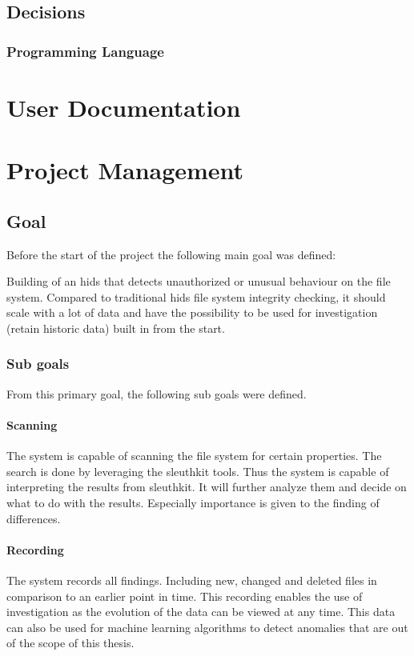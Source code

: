 \documentclass[
	a4paper,					%
	10pt,							%
	twoside,					%
	openright,				%
	notitlepage,			%
	parskip=half,			%
]{scrreprt}					%
\begin{document}
\section{Decisions}
\label{sec:decisions}

\subsection{Programming Language}
\label{sec:decisions:language}

\chapter{User Documentation}

\chapter{Project Management}

\section{Goal}
\label{apdx-sec:goal}
Before the start of the project the following main goal was defined:

Building of an \gls{hids} that detects unauthorized or unusual behaviour on the file system. Compared to traditional \gls{hids} file system integrity checking, it should scale with a lot of data and have the possibility to be used for investigation (retain historic data) built in from the start.

\subsection{Sub goals}

From this primary goal, the following sub goals were defined. 

\subsubsection{Scanning}
The system is capable of scanning the file system for certain properties. The search is done by leveraging the sleuthkit tools. Thus the system is capable of interpreting the results from sleuthkit. It will further analyze them and decide on what to do with the results. Especially importance is given to the finding of differences.

\subsubsection{Recording}
The system records all findings. Including new, changed and deleted files in comparison to an earlier point in time. This recording enables the use of investigation as the evolution of the data can be viewed at any time. This data can also be used for machine learning algorithms to detect anomalies that are out of the scope of this thesis. 
\end{document}
